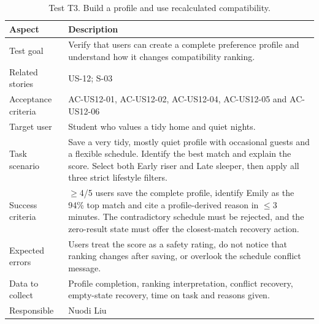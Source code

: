 \documentclass[11pt,a4paper]{article}
\begin{document}
\begin{table}[H]
    \centering
    \small
    \caption{Test T3. Build a profile and use recalculated compatibility.}
    \begin{tabularx}{\textwidth}{@{}L{3.4cm}Y@{}}
        \toprule
        Aspect & Description\\
        \midrule
        Test goal & Verify that users can create a complete preference profile and understand how it changes compatibility ranking.\\
        Related stories & US-12; S-03\\
        Acceptance criteria & AC-US12-01, AC-US12-02, AC-US12-04, AC-US12-05 and AC-US12-06\\
        Target user & Student who values a tidy home and quiet nights.\\
        Task scenario & Save a very tidy, mostly quiet profile with occasional guests and a flexible schedule. Identify the best match and explain the score. Select both Early riser and Late sleeper, then apply all three strict lifestyle filters.\\
        Success criteria & $\geq$4/5 users save the complete profile, identify Emily as the 94\% top match and cite a profile-derived reason in $\leq$3 minutes. The contradictory schedule must be rejected, and the zero-result state must offer the closest-match recovery action.\\
        Expected errors & Users treat the score as a safety rating, do not notice that ranking changes after saving, or overlook the schedule conflict message.\\
        Data to collect & Profile completion, ranking interpretation, conflict recovery, empty-state recovery, time on task and reasons given.\\
        Responsible & Nuodi Liu\\
        \bottomrule
    \end{tabularx}
    \label{tabtestt3}
\end{table}
\end{document}
